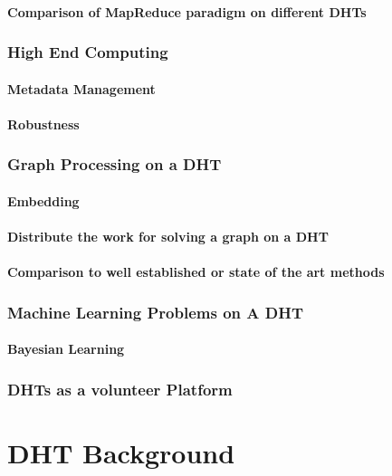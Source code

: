 \documentclass[10pt,letterpaper]{report}
\begin{document}
\subsubsection{Comparison of  MapReduce paradigm on different DHTs}


\subsection{High End Computing}
\subsubsection{Metadata Management}
\subsubsection{Robustness}

\subsection{Graph Processing on a DHT}
\subsubsection{Embedding}
\subsubsection{Distribute the work for solving a graph on a DHT}
\subsubsection{Comparison to well established or state of the art methods}

\subsection{Machine Learning Problems on A DHT}
\subsubsection{Bayesian Learning}

\subsection{DHTs as a volunteer Platform}

\chapter{DHT Background}





\end{document}
